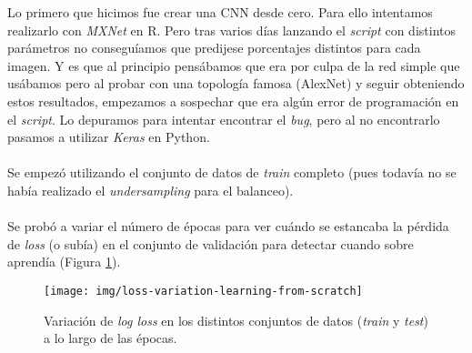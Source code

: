 Lo primero que hicimos fue crear una CNN  desde cero. Para ello intentamos realizarlo con \textit{MXNet} en R. Pero tras varios días lanzando el \textit{script} con distintos parámetros no conseguíamos que predijese porcentajes distintos para cada imagen. Y es que al principio pensábamos que era por culpa de la red simple que usábamos pero al probar con una topología famosa (AlexNet) y seguir obteniendo estos resultados, empezamos a sospechar que era algún error de programación en el \textit{script}. Lo depuramos para intentar encontrar el \textit{bug}, pero al no encontrarlo pasamos a utilizar \textit{Keras} en Python.
\\ \\
Se empezó utilizando el conjunto de datos de \textit{train} completo (pues todavía no se había realizado el \textit{undersampling} para el balanceo).
\\ \\
Se probó a variar el número de épocas para ver cuándo se estancaba la pérdida de \textit{loss} (o subía) en el conjunto de validación para detectar cuando sobre aprendía (Figura \ref{fig:loss-variation-learning-from-scratch}).

\begin{figure}[H]
	\centering
	\texttt{[image: img/loss-variation-learning-from-scratch]}
	\caption{Variación de \textit{log loss} en los distintos conjuntos de datos (\textit{train} y \textit{test}) a lo largo de las épocas.}
	\label{fig:loss-variation-learning-from-scratch}
\end{figure}

